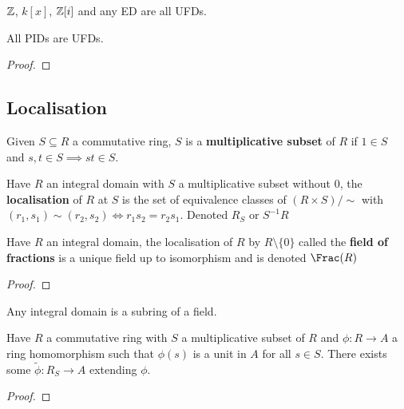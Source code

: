 \documentclass{report}
\begin{document}
\begin{examples}
    $\mathbb{Z}$, $k[x]$, $\mathbb{Z}[i]$ and any ED are all UFDs.
\end{examples}

\begin{theorem}
    All PIDs are UFDs.\begin{proof}
        
    \end{proof}
\end{theorem}

\subsection{Localisation}

\begin{definition}
    Given $S\subseteq R$ a commutative ring, $S$ is a \textbf{multiplicative subset} of $R$ if $1\in S$ and $s,t\in S\implies st\in S$.
\end{definition}

\begin{definition}[Localisation]
    Have $R$ an integral domain with $S$ a multiplicative subset without $0$, the \textbf{localisation} of $R$ at $S$ is the set of equivalence classes of $(R\times S)/\sim$ with $(r_1,s_1)\sim(r_2,s_2)\iff r_1s_2=r_2s_1$. Denoted $R_S$ or $S^{-1}R$
\end{definition}

\begin{theorem}
    Have $R$ an integral domain, the localisation of $R$ by $R\setminus\{0\}$ called the \textbf{field of fractions} is a unique field up to isomorphism and is denoted $\Frac(R)$ \begin{proof}
        
    \end{proof}
\end{theorem}

\begin{corollary}
    Any integral domain is a subring of a field.
\end{corollary}

\begin{lemma}
    Have $R$ a commutative ring with $S$ a multiplicative subset of $R$ and $\phi:R\rightarrow A$ a ring homomorphism such that $\phi(s)$ is a unit in $A$ for all $s\in S$. There exists some $\tilde{\phi}:R_S\rightarrow A$ extending $\phi$. \begin{proof}
        
    \end{proof}
\end{lemma}
\end{document}
